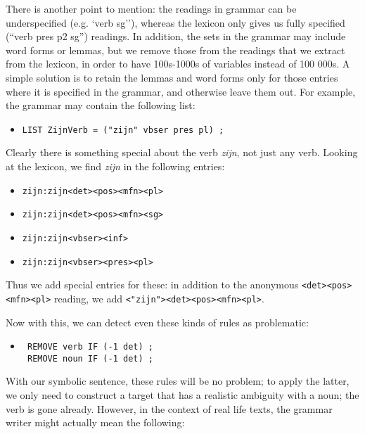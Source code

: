There is another point to mention: the readings in grammar can be underspecified (e.g. `verb sg''), whereas the lexicon only gives us fully specified (``verb pres p2 sg'') readings. 
In addition, the sets in the grammar may include word forms or lemmas, but we remove those from the readings that we extract from the lexicon, in order to have 100s-1000s of variables instead of 100 000s.
A simple solution is to retain the lemmas and word forms only for those entries where it is specified in the grammar, and otherwise leave them out. For example, the grammar may contain the following list:

\begin{itemize}
 \item[] \texttt{LIST ZijnVerb = ("zijn" vbser pres pl) ;}
\end{itemize}

Clearly there is something special about the verb \emph{zijn}, not just any verb. Looking at the lexicon, we find \emph{zijn} in the following entries:

\begin{itemize}
 \item[] \texttt{zijn:zijn<det><pos><mfn><pl>}
 \item[] \texttt{zijn:zijn<det><pos><mfn><sg>}
 \item[] \texttt{zijn:zijn<vbser><inf>}
 \item[] \texttt{zijn:zijn<vbser><pres><pl>}
\end{itemize}

Thus we add special entries for these: in addition to the anonymous \texttt{<det><pos><mfn><pl>} reading, we add \texttt{<"zijn"><det><pos><mfn><pl>}.



Now with this, we can detect even these kinds of rules as problematic:

 \begin{itemize}
 \item[] \begin{verbatim}
 REMOVE verb IF (-1 det) ;
 REMOVE noun IF (-1 det) ;
 \end{verbatim}
 \end{itemize}

 With our symbolic sentence, these rules will be no problem; to apply the latter, we only need to construct a target that has a realistic ambiguity with a noun; the verb is gone already.
 However, in the context of real life texts, the grammar writer might actually mean the following:

